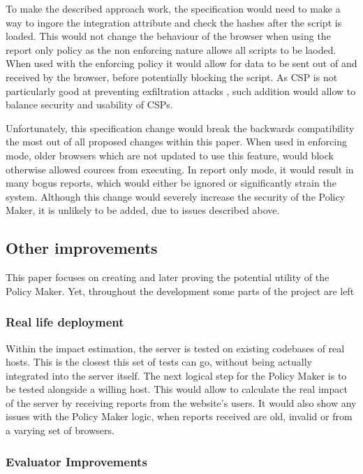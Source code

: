 \begin{description}
To make the described approach work, the specification would need to make a way to ingore the integration attribute and check the hashes after the script is loaded.
This would not change the behaviour of the browser when using the report only policy as the non enforcing nature allows all scripts to be laoded.
When used with the enforcing policy it would allow for data to be sent out of and received by the browser, before potentially blocking the script.
As CSP is not particularly good at preventing exfiltration attacks \cite{CSPexfil}, such addition would allow to balance security and usability of CSPs.

Unfortunately, this specification change would break the backwards compatibility the most out of all proposed changes within this paper.
When used in enforcing mode, older browsers which are not updated to use this feature, would block otherwise allowed cources from executing.
In report only mode, it would result in many bogus reports, which would either be ignored or significantly strain the system.
Although this change would severely increase the security of the Policy Maker, it is unlikely to be added, due to issues described above.

\subsection{Other improvements}

This paper focuses on creating and later proving the potential utility of the Policy Maker.
Yet, throughout the development some parts of the project are left 

\subsubsection{Real life deployment}

Within the impact estimation, the server is tested on existing codebases of real hosts.
This is the closest this set of tests can go, without being actually integrated into the server itself.
The next logical step for the Policy Maker is to be tested alongside a willing host.
This would allow to calculate the real impact of the server by receiving reports from the website's users.
It would also show any issues with the Policy Maker logic, when reports received are old, invalid or from a varying set of browsers.

\subsubsection{Evaluator Improvements}


\end{description}
